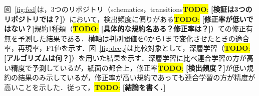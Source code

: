\documentclass[uplatex,dvipdfmx,a4paper,twocolumn,base=11pt,jbase=11pt,ja=standard]{bxjsarticle}  %
\newcommand{\todo}[1]{\colorbox{yellow}{{\bf TODO}:}{\color{red} {\textbf{[#1]}}}}
\begin{document}




図~\ref{fig:fed}は，3つのリポジトリ（schematics，transitions\todo{検証は3つのリポジトリでは？}）において，検出頻度に偏りがある\todo{修正率が低いではない？}規約1種類（\todo{具体的な規約名ある？修正率は？}）ての修正有無を予測した結果である．横軸は判別閾値を0から1まで変化させたときの適合率，再現率，F1値を示す．図~\ref{fig:deep}は比較対象として，深層学習（\todo{アルゴリズムは何？}）を用いた結果を示す．深層学習に比べ連合学習の方が高い精度で予測しているが，紙面の都合上，修正率\todo{検出頻度？}が低い規約の結果のみ示しているが，修正率が高い規約であっても連合学習の方が精度が高いことを示した．従って，\todo{結論を書く．}

%
%

\end{document}
